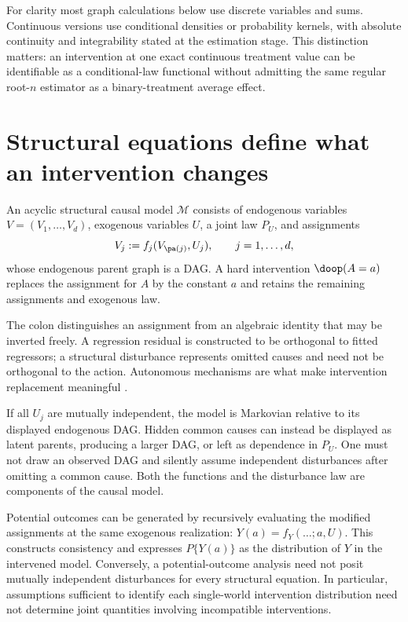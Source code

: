 For clarity most graph calculations below use discrete variables and sums.
Continuous versions use conditional densities or probability kernels, with
absolute continuity and integrability stated at the estimation stage. This
distinction matters: an intervention at one exact continuous treatment value
can be identifiable as a conditional-law functional without admitting the
same regular root-$n$ estimator as a binary-treatment average effect.

\section{Structural equations define what an intervention changes}
\begin{definition}
An acyclic structural causal model $\mathcal M$ consists of endogenous
variables $V=(V_1,\ldots,V_d)$, exogenous variables $U$, a joint law $P_U$,
and assignments
\[
 V_j:=f_j(V_{\pa(j)},U_j),\qquad j=1,\ldots,d,
\]
whose endogenous parent graph is a DAG. A hard intervention $\doop(A=a)$
replaces the assignment for $A$ by the constant $a$ and retains the remaining
assignments and exogenous law.
\end{definition}
The colon distinguishes an assignment from an algebraic identity that may
be inverted freely. A regression residual is constructed to be orthogonal
to fitted regressors; a structural disturbance represents omitted causes
and need not be orthogonal to the action. Autonomous mechanisms are what
make intervention replacement meaningful \citep[Sections 3.1--3.2]{pearl2009}.

If all $U_j$ are mutually independent, the model is Markovian relative to
its displayed endogenous DAG. Hidden common causes can instead be displayed
as latent parents, producing a larger DAG, or left as dependence in $P_U$.
One must not draw an observed DAG and silently assume independent disturbances
after omitting a common cause. Both the functions and the disturbance law
are components of the causal model.

Potential outcomes can be generated by recursively evaluating the modified
assignments at the same exogenous realization: $Y(a)=f_Y(\ldots;a,U)$.
This constructs consistency and expresses $P\{Y(a)\}$ as the distribution
of $Y$ in the intervened model. Conversely, a potential-outcome analysis
need not posit mutually independent disturbances for every structural
equation. In particular, assumptions sufficient to identify each
single-world intervention distribution need not determine joint quantities
involving incompatible interventions.

